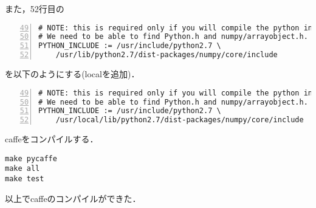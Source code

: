 \documentclass[a4paper,10pt]{jsarticle}
\begin{document}
また，52行目の
\begin{lstlisting}[basicstyle=\ttfamily\footnotesize, frame=single, firstnumber=49, numbers=left]
# NOTE: this is required only if you will compile the python interface.
# We need to be able to find Python.h and numpy/arrayobject.h.
PYTHON_INCLUDE := /usr/include/python2.7 \
    /usr/lib/python2.7/dist-packages/numpy/core/include
\end{lstlisting}
を以下のようにする(localを追加)．
\begin{lstlisting}[basicstyle=\ttfamily\footnotesize, frame=single, firstnumber=49, numbers=left]
# NOTE: this is required only if you will compile the python interface.
# We need to be able to find Python.h and numpy/arrayobject.h.
PYTHON_INCLUDE := /usr/include/python2.7 \
    /usr/local/lib/python2.7/dist-packages/numpy/core/include
\end{lstlisting}

caffeをコンパイルする．
\begin{lstlisting}[basicstyle=\ttfamily\footnotesize, frame=single]
make pycaffe
make all
make test
\end{lstlisting}

以上でcaffeのコンパイルができた．
\end{document}
